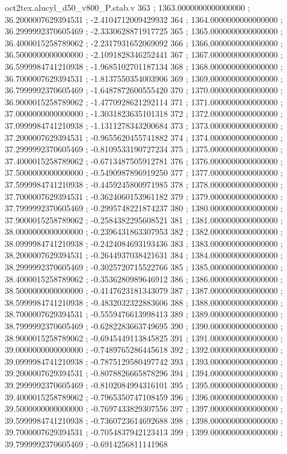 \begin{filecontents}[overwrite]{oct2tex.alucyl_d50_v800_P.stab.v}
363 ; 1363.0000000000000000 ; 36.2000007629394531 ; -2.4104712009429932
364 ; 1364.0000000000000000 ; 36.2999992370605469 ; -2.3330628871917725
365 ; 1365.0000000000000000 ; 36.4000015258789062 ; -2.2317931652069092
366 ; 1366.0000000000000000 ; 36.5000000000000000 ; -2.1091828346252441
367 ; 1367.0000000000000000 ; 36.5999984741210938 ; -1.9685102701187134
368 ; 1368.0000000000000000 ; 36.7000007629394531 ; -1.8137550354003906
369 ; 1369.0000000000000000 ; 36.7999992370605469 ; -1.6487872600555420
370 ; 1370.0000000000000000 ; 36.9000015258789062 ; -1.4770928621292114
371 ; 1371.0000000000000000 ; 37.0000000000000000 ; -1.3031823635101318
372 ; 1372.0000000000000000 ; 37.0999984741210938 ; -1.1311278343200684
373 ; 1373.0000000000000000 ; 37.2000007629394531 ; -0.9655620455741882
374 ; 1374.0000000000000000 ; 37.2999992370605469 ; -0.8109533190727234
375 ; 1375.0000000000000000 ; 37.4000015258789062 ; -0.6713487505912781
376 ; 1376.0000000000000000 ; 37.5000000000000000 ; -0.5490987896919250
377 ; 1377.0000000000000000 ; 37.5999984741210938 ; -0.4459245800971985
378 ; 1378.0000000000000000 ; 37.7000007629394531 ; -0.3624060153961182
379 ; 1379.0000000000000000 ; 37.7999992370605469 ; -0.2995748221874237
380 ; 1380.0000000000000000 ; 37.9000015258789062 ; -0.2584382295608521
381 ; 1381.0000000000000000 ; 38.0000000000000000 ; -0.2396431863307953
382 ; 1382.0000000000000000 ; 38.0999984741210938 ; -0.2424084693193436
383 ; 1383.0000000000000000 ; 38.2000007629394531 ; -0.2644937038421631
384 ; 1384.0000000000000000 ; 38.2999992370605469 ; -0.3025720715522766
385 ; 1385.0000000000000000 ; 38.4000015258789062 ; -0.3536280989646912
386 ; 1386.0000000000000000 ; 38.5000000000000000 ; -0.4147623181343079
387 ; 1387.0000000000000000 ; 38.5999984741210938 ; -0.4832032322883606
388 ; 1388.0000000000000000 ; 38.7000007629394531 ; -0.5559476613998413
389 ; 1389.0000000000000000 ; 38.7999992370605469 ; -0.6282283663749695
390 ; 1390.0000000000000000 ; 38.9000015258789062 ; -0.6945449113845825
391 ; 1391.0000000000000000 ; 39.0000000000000000 ; -0.7489765286445618
392 ; 1392.0000000000000000 ; 39.0999984741210938 ; -0.7875129580497742
393 ; 1393.0000000000000000 ; 39.2000007629394531 ; -0.8078826665878296
394 ; 1394.0000000000000000 ; 39.2999992370605469 ; -0.8102084994316101
395 ; 1395.0000000000000000 ; 39.4000015258789062 ; -0.7965350747108459
396 ; 1396.0000000000000000 ; 39.5000000000000000 ; -0.7697433829307556
397 ; 1397.0000000000000000 ; 39.5999984741210938 ; -0.7360723614692688
398 ; 1398.0000000000000000 ; 39.7000007629394531 ; -0.7054837942123413
399 ; 1399.0000000000000000 ; 39.7999992370605469 ; -0.6914256811141968

\end{filecontents}
